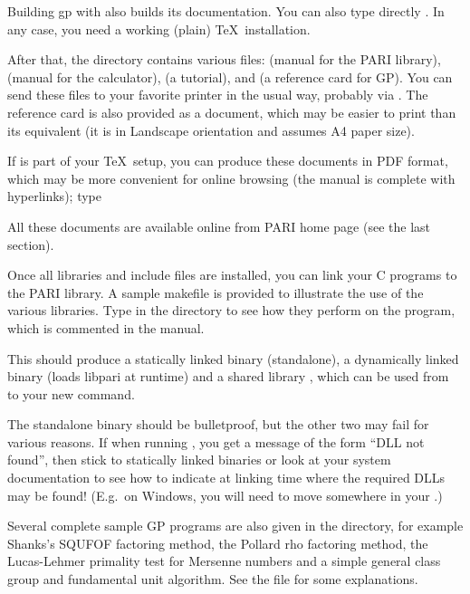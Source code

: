  Building gp with  also builds
its documentation. You can also type directly . In any case,
you need a working (plain) \TeX\ installation.

After that, the  directory contains various  files:
 (manual for the PARI library),  (manual
for the  calculator),  (a tutorial), and
 (a reference card for GP). You can send these files to your
favorite printer in the usual way, probably via . The reference
card is also provided as a  document, which may be easier to
print than its  equivalent (it is in Landscape orientation and
assumes A4 paper size).

\noindent If  is part of your \TeX\ setup, you can produce these
documents in PDF format, which may be more convenient for online browsing
(the manual is complete with hyperlinks); type


\noindent All these documents are available online from PARI home page
(see the last section).

 Once all libraries and include files are installed,
you can link your C programs to the PARI library. A sample makefile
 is provided to illustrate the use of the various
libraries. Type  in the  directory to see how
they perform on the  program, which is commented in the
manual.

This should produce a statically linked binary 
(standalone), a dynamically linked binary  (loads libpari
at runtime) and a shared library , which can be used from
 to  your new  command.

The standalone binary should be bulletproof, but the other two may fail
for various reasons. If when running , you get a message
of the form ``DLL not found'', then stick to statically linked binaries
or look at your system documentation to see how to indicate at linking
time where the required DLLs may be found! (E.g.~on Windows, you will
need to move  somewhere in your .)

 Several complete sample GP programs are also given in
the  directory, for example Shanks's SQUFOF factoring method,
the Pollard rho factoring method, the Lucas-Lehmer primality test for
Mersenne numbers and a simple general class group and fundamental unit
algorithm. See the file  for some explanations.

